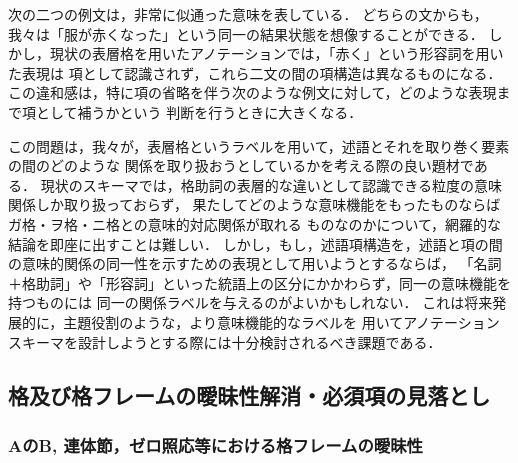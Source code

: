 \documentclass[japanese]{jnlp_1.4}
\begin{document}
次の二つの例文は，非常に似通った意味を表している．
どちらの文からも，我々は「服が赤くなった」という同一の結果状態を想像することができる．
しかし，現状の表層格を用いたアノテーションでは，「赤く」という形容詞を用いた表現は
項として認識されず，これら二文の間の項構造は異なるものになる．
この違和感は，特に項の省略を伴う次のような例文に対して，どのような表現まで項として補うかという
判断を行うときに大きくなる．

この問題は，我々が，表層格というラベルを用いて，述語とそれを取り巻く要素の間のどのような
関係を取り扱おうとしているかを考える際の良い題材である．
現状のスキーマでは，格助詞の表層的な違いとして認識できる粒度の意味関係しか取り扱っておらず，
果たしてどのような意味機能をもったものならばガ格・ヲ格・ニ格との意味的対応関係が取れる
ものなのかについて，網羅的な結論を即座に出すことは難しい．
しかし，もし，述語項構造を，述語と項の間の意味的関係の同一性を示すための表現として用いようとするならば，
「名詞＋格助詞」や「形容詞」といった統語上の区分にかかわらず，同一の意味機能を持つものには
同一の関係ラベルを与えるのがよいかもしれない．
これは将来発展的に，主題役割のような，より意味機能的なラベルを
用いてアノテーションスキーマを設計しようとする際には十分検討されるべき課題である．


\subsection{格及び格フレームの曖昧性解消・必須項の見落とし}
\label{sec:frame-ambiguity-argument-loss}

\subsubsection{AのB, 連体節，ゼロ照応等における格フレームの曖昧性}
\label{sec:frame-ambiguity}
\end{document}
